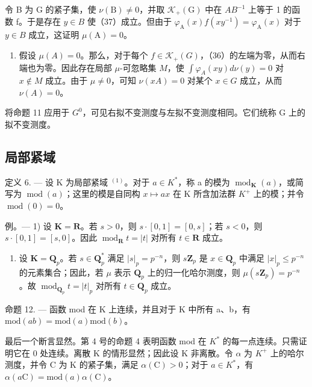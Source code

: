 令 B 为 G 的紧子集，使 \(\nu(\mathrm{B})\neq0\)，并取 \(\mathcal{K}_{+}(\mathrm{G})\) 中在 \(AB^{-1}\) 上等于 1 的函数 f。于是存在 \(y\in B\) 使（37）成立。但由于 \(\varphi_{\mathrm{A}}(x)f(xy^{-1})=\varphi_{\mathrm{A}}(x)\) 对于 \(y\in B\) 成立，这证明 \(\mu(\mathrm{A})=0\)。

\begin{enumerate}
\def\labelenumi{\alph{enumi})}
\setcounter{enumi}{2}
\tightlist
\item
  假设 \(\mu(A) = 0\)。那么，对于每个 \(f \in \mathcal{K}_{+}(G)\)，（36）的左端为零，从而右端也为零。因此存在局部 \(\mu\)-可忽略集 \(M\)，使 \(\int \varphi_{A}(xy) d\nu(y) = 0\) 对 \(x \notin M\) 成立。由于 \(\mu \neq 0\)，可知 \(\nu(xA) = 0\) 对某个 \(x \in G\) 成立，从而 \(\nu(A) = 0\)。
\end{enumerate}

将命题 11 应用于 \(G^{0}\)，可见右拟不变测度与左拟不变测度相同。它们统称 G 上的拟不变测度。

\subsection{局部紧域}

定义 6. --- 设 K 为局部紧域 \(^{(1)}\)。对于 \(a \in K^{*}\)，称 a 的模为 \(\operatorname{mod}_{\mathbf{K}}(a)\)，或简写为 \(\operatorname{mod}(a)\)；这里的模是自同构 \(x \mapsto ax\) 在 K 所含加法群 \(K^{+}\) 上的模；并令 \(\operatorname{mod}(0) = 0\)。

例。--- 1) 设 \(\mathbf{K} = \mathbf{R}\)。若 \(s > 0\)，则 \(s \cdot [0,1] = [0,s]\)；若 \(s < 0\)，则 \(s \cdot [0,1] = [s,0]\)。因此 \(\operatorname{mod}_{\mathbf{R}} t = |t|\) 对所有 \(t \in \mathbf{R}\) 成立。

\begin{enumerate}
\def\labelenumi{\arabic{enumi})}
\setcounter{enumi}{1}
\tightlist
\item
  设 \(\mathbf{K} = \mathbf{Q}_p\)。若 \(s \in \mathbf{Q}_p^*\) 满足 \(|s|_p = p^{-n}\)，则 \(s\mathbf{Z}_p\) 是 \(x \in \mathbf{Q}_p\) 中满足 \(|x|_p \leqslant p^{-n}\) 的元素集合；因此，若 \(\mu\) 表示 \(\mathbf{Q}_p\) 上的归一化哈尔测度，则 \(\mu(s\mathbf{Z}_p) = p^{-n}\)。故 \(\operatorname{mod}_{\mathbf{Q}_p} t = |t|_p\) 对所有 \(t \in \mathbf{Q}_p\) 成立。
\end{enumerate}

命题 12. --- 函数 mod 在 K 上连续，并且对于 K 中所有 a、b，有 \(\text{mod}(ab) = \text{mod}(a)\text{mod}(b)\)。

最后一个断言显然。第 4 号的命题 4 表明函数 mod 在 \(K^{*}\) 的每一点连续。只需证明它在 0 处连续。离散 K 的情形显然；因此设 K 非离散。令 \(\alpha\) 为 \(K^{+}\) 上的哈尔测度，并令 C 为 K 的紧子集，满足 \(\alpha(\mathrm{C}) > 0\)；对于 \(a \in K^{*}\)，有 \(\alpha(a\mathrm{C}) = \mathrm{mod}(a)\alpha(\mathrm{C})\)。

